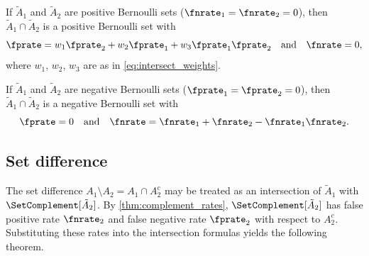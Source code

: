 \begin{corollary}
\label{cor:intersect_positive}
If $\tilde{A}_1$ and $\tilde{A}_2$ are positive Bernoulli sets
($\fnrate_1 = \fnrate_2 = 0$), then $\tilde{A}_1 \cap \tilde{A}_2$ is a
positive Bernoulli set with
\begin{equation}
\fprate = w_1 \fprate_2 + w_2 \fprate_1
        + w_3 \fprate_1 \fprate_2
\quad \text{and} \quad
\fnrate = 0,
\end{equation}
where $w_1$, $w_2$, $w_3$ are as in
\cref{eq:intersect_weights}.
\end{corollary}

\begin{corollary}
\label{cor:intersect_negative}
If $\tilde{A}_1$ and $\tilde{A}_2$ are negative Bernoulli sets
($\fprate_1 = \fprate_2 = 0$), then $\tilde{A}_1 \cap \tilde{A}_2$ is a
negative Bernoulli set with
\begin{equation}
\fprate = 0
\quad \text{and} \quad
\fnrate = \fnrate_1 + \fnrate_2 - \fnrate_1 \fnrate_2.
\end{equation}
\end{corollary}

\subsection{Set difference}
\label{sec:setdiff}
The set difference $A_1 \setminus A_2 = A_1 \cap A_2^c$ may be treated as
an intersection of $\tilde{A}_1$ with $\SetComplement[\tilde{A}_2]$.
By \cref{thm:complement_rates}, $\SetComplement[\tilde{A}_2]$ has false
positive rate $\fnrate_2$ and false negative rate $\fprate_2$ with respect
to $A_2^c$.
Substituting these rates into the intersection formulas yields the following
theorem.

